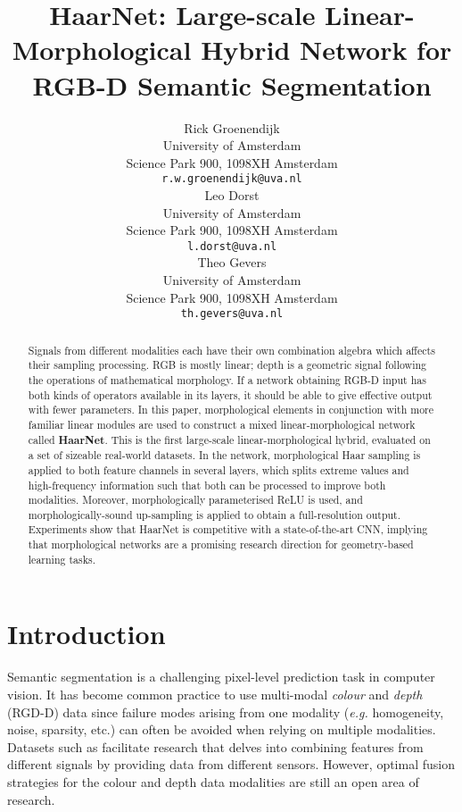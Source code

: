 \documentclass{article}
\title{HaarNet: Large-scale Linear-Morphological Hybrid Network for RGB-D Semantic Segmentation}
\author{
 Rick Groenendijk \\
  University of Amsterdam \\
  Science Park 900, 1098XH Amsterdam \\
  \texttt{r.w.groenendijk@uva.nl} \\
   \And
 Leo Dorst \\
  University of Amsterdam \\
  Science Park 900, 1098XH Amsterdam \\
  \texttt{l.dorst@uva.nl} \\
  \And
 Theo Gevers \\
  University of Amsterdam \\
  Science Park 900, 1098XH Amsterdam \\
  \texttt{th.gevers@uva.nl} \\
}
\def\eg{\emph{e.g. }}
\begin{document}
\maketitle
\begin{abstract}
Signals from different modalities each have their own combination algebra which affects their sampling processing.
RGB is mostly linear; depth is a geometric signal following the operations of mathematical morphology.
If a network obtaining RGB-D input has both kinds of operators available in its layers, it should be able to give effective output with fewer parameters.
In this paper, morphological elements in conjunction with more familiar linear modules are used to construct a mixed linear-morphological network called \textbf{HaarNet}.
This is the first large-scale linear-morphological hybrid, evaluated on a set of sizeable real-world datasets.
In the network, morphological Haar sampling is applied to both feature channels in several layers, which splits extreme values and high-frequency information such that both can be processed to improve both modalities. 
Moreover, morphologically parameterised ReLU is used, and morphologically-sound up-sampling is applied to obtain a full-resolution output.
Experiments show that HaarNet is competitive with a state-of-the-art CNN, implying that morphological networks are a promising research direction for geometry-based learning tasks.
\end{abstract}

\section{Introduction} \label{sec:introduction}
Semantic segmentation is a challenging pixel-level prediction task in computer vision.
It has become common practice \cite{silberman2012indoor,gupta2014learning} to use multi-modal \emph{colour} and \emph{depth} (RGD-D) data since failure modes arising from one modality (\eg homogeneity, noise, sparsity, etc.) can often be avoided when relying on multiple modalities.
Datasets such as \cite{silberman2012indoor,armeni2017joint,cordts2016cityscapes} facilitate research that delves into combining features from different signals by providing data from different sensors.
However, optimal fusion strategies for the colour and depth data modalities are still an open area of research.
\end{document}
